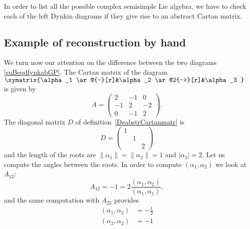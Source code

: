 In order to list all the possible complex semisimple Lie algebra, we have to check each of the left Dynkin diagrams if they give rise to an abstract Cartan matrix.



\subsection{Example of reconstruction by hand}
\label{subsecRecbyhanfd}

We turn now our attention on the difference between the two diagrams \eqref{suBeqdfynkabGP}. The Cartan matrix of the diagram $
        \xymatrix{%
        \alpha_1 \ar@{-}[r]&\alpha_2 \ar@2{->}[r]&\alpha_3
        }   $ is given by
        \begin{equation}
        A=\begin{pmatrix}
            2    &   -1    &   0    \\
            -1    &   2    &   -2    \\
            0    &   -1    &   2
       \end{pmatrix}.
        \end{equation}
The diagonal matrix \( D\) of definition~\ref{DeabstrCartanmatr} is
\begin{equation}
    D=\begin{pmatrix}
        1    &       &       \\
            &   1    &       \\
            &       &   2
    \end{pmatrix}
\end{equation}
and the length of the roots are \( \| \alpha_1 \|=\| \alpha_2 \|=1\) and \( | \alpha_3 |=2\). Let us compute the angles between the roots. In order to compute \( (\alpha_1,\alpha_2)\) we look at \( A_{12}\):
\begin{equation}
    A_{12}=-1=2\frac{ (\alpha_1,\alpha_2) }{ (\alpha_1,\alpha_1) },
\end{equation}
and the same computation with \( A_{23}\) provides
\begin{subequations}
    \begin{align}
        (\alpha_1,\alpha_2)&=-\frac{ 1 }{2}\\
        (\alpha_2,\alpha_3)&=-1
    \end{align}
\end{subequations}
